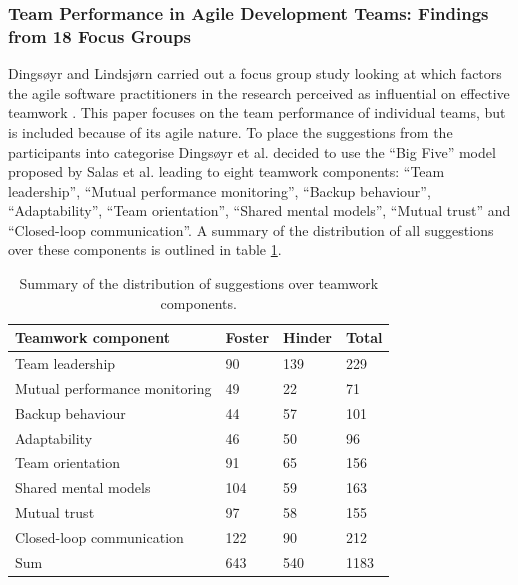\subsubsection{Team Performance in Agile Development Teams: Findings from 18 Focus Groups}

Dingsøyr and Lindsjørn carried out a focus group study looking at which factors the agile software practitioners in the research perceived as influential on effective teamwork \cite{Dingsoyr2013c}. This paper focuses on the team performance of individual teams, but is included because of its agile nature. To place the suggestions from the participants into categorise Dingsøyr et al. decided to use the ``Big Five'' model proposed by Salas et al. \cite{Salas2005} leading to eight teamwork components: ``Team leadership'', ``Mutual performance monitoring'', ``Backup behaviour'', ``Adaptability'', ``Team orientation'', ``Shared mental models'', ``Mutual trust'' and ``Closed-loop communication''. A summary of the distribution of all suggestions over these components is outlined in table \ref{summary2}.

\begin{table}[H]
\begin{center}
    \begin{tabular}{ | p{6cm} | p{2.5cm} | p{2.5cm} | p{2.5cm} |}
    \hline
    \textbf{Teamwork component} & \textbf{Foster} & \textbf{Hinder} & \textbf{Total} \\ \hline
    Team leadership & 90 & 139 & 229 \\ \hline
    Mutual performance monitoring & 49 & 22 & 71 \\ \hline
    Backup behaviour & 44 & 57 & 101 \\ \hline
    Adaptability & 46 & 50 & 96 \\ \hline
    Team orientation & 91 & 65 & 156 \\ \hline
    Shared mental models & 104 & 59 & 163 \\ \hline
    Mutual trust & 97 & 58 & 155 \\ \hline
    Closed-loop communication & 122 & 90 & 212 \\ \hline
    Sum & 643 & 540 & 1183 \\ \hline
    \end{tabular}
    \caption{Summary of the distribution of suggestions over teamwork components.}
    \label{summary2}
\end{center}
\end{table}

